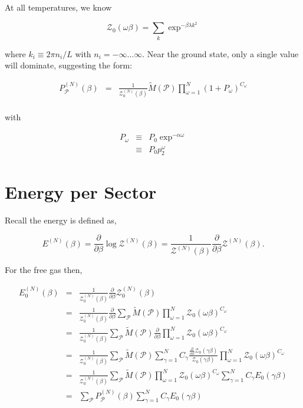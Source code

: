 \documentclass[aps,preprint,showpacs,superscriptaddress,groupedaddress]{revtex4}  %
\begin{document}
At all temperatures, we know

\begin{equation}
  \mathcal{Z}_{0}(\omega\beta) = \sum_{k} \exp^{-\beta \lambda k^2}
\end{equation}

where $k_{i} \equiv 2\pi n_{i}/L$ with $n_{i} = -\infty \dots \infty$. Near the ground state, only a single value will dominate, suggesting the form:

\begin{eqnarray}
  P_{\mathcal{P}}^{(N)}(\beta) &=& \frac{1}{\mathcal{Z}_{0}^{(N)}(\beta)} \tilde{M}(\mathcal{P}) \prod_{\omega=1}^{N} (1+P_{\omega})^{C_{\omega}} \\
\end{eqnarray}

with

\begin{eqnarray}
  P_{\omega} &\equiv& P_{0}\exp^{-\alpha \omega} \\
             &\equiv& P_{0}p_{2}^{\omega}
\end{eqnarray}

\section{Energy per Sector}

Recall the energy is defined as,

\begin{equation}
  E^{(N)}(\beta) = \frac{\partial}{\partial\beta} \log{\mathcal{Z}^{(N)}(\beta)} = \frac{1}{\mathcal{Z}^{(N)}(\beta)} \frac{\partial}{\partial\beta} \mathcal{Z}^{(N)}(\beta).
\end{equation}

For the free gas then,

\begin{eqnarray}
  E_{0}^{(N)}(\beta) &=& \frac{1}{\mathcal{Z}_{0}^{(N)}(\beta)} \frac{\partial}{\partial\beta} \mathcal{Z}_{0}^{(N)}(\beta) \\
                     &=& \frac{1}{\mathcal{Z}_{0}^{(N)}(\beta)} \frac{\partial}{\partial\beta} \sum_{\mathcal{P}} \tilde{M}(\mathcal{P}) \prod_{\omega=1}^{N} \mathcal{Z}_{0}(\omega\beta)^{C_{\omega}} \\
                     &=& \frac{1}{\mathcal{Z}_{0}^{(N)}(\beta)} \sum_{\mathcal{P}} \tilde{M}(\mathcal{P}) \frac{\partial}{\partial\beta} \prod_{\omega=1}^{N} \mathcal{Z}_{0}(\omega\beta)^{C_{\omega}} \\
                     &=& \frac{1}{\mathcal{Z}_{0}^{(N)}(\beta)} \sum_{\mathcal{P}} \tilde{M}(\mathcal{P}) \sum_{\gamma=1}^{N} C_{\gamma} \frac{\frac{\partial}{\partial\beta}\mathcal{Z}_{0}(\gamma\beta)}{\mathcal{Z}_{0}(\gamma\beta)} \prod_{\omega=1}^{N} \mathcal{Z}_{0}(\omega\beta)^{C_{\omega}} \\
                     &=& \frac{1}{\mathcal{Z}_{0}^{(N)}(\beta)} \sum_{\mathcal{P}} \tilde{M}(\mathcal{P}) \prod_{\omega=1}^{N} \mathcal{Z}_{0}(\omega\beta)^{C_{\omega}} \sum_{\gamma=1}^{N} C_{\gamma} E_{0}(\gamma\beta) \\
                     &=& \sum_{\mathcal{P}} P_{\mathcal{P}}^{(N)}(\beta) \sum_{\gamma=1}^{N} C_{\gamma} E_{0}(\gamma\beta)
\end{eqnarray}
\end{document}
